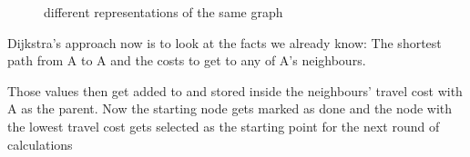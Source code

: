 \begin{figure}[htp]
    \centering
  	\caption{different representations of the same graph}
\end{figure}


Dijkstra's approach now is to look at the facts we already know:
The shortest path from A to A
and the costs to get to any of A's neighbours.

Those values then get added to and stored  inside the neighbours' travel cost with A as the parent.
Now the starting node gets marked as done
and the node with the lowest travel cost gets selected
as the starting point for the next round of calculations

